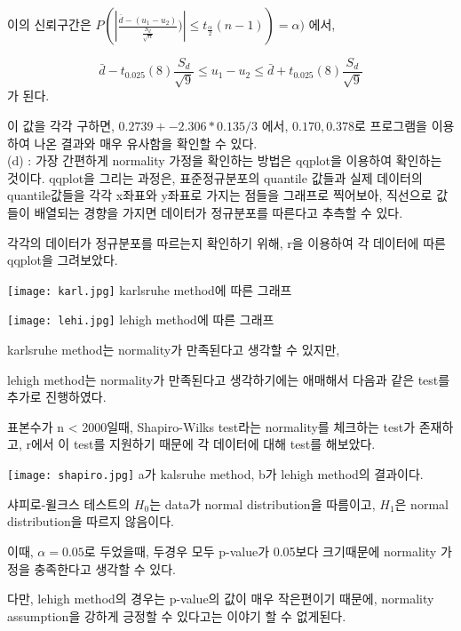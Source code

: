 \documentclass{article}
\begin{document}
이의 신뢰구간은 $P(|\frac{\bar{d} - (u_1 - u_2)}{\frac{S_d}{\sqrt{n}}})| \le t_{\frac{\alpha}{2}}(n-1)) = \alpha)$ 에서,

$$\bar{d} - t_{0.025}(8) \frac{S_d}{\sqrt{9}} \le u_1 - u_2 \le \bar{d} + t_{0.025}(8) \frac{S_d}{\sqrt{9}}$$ 가 된다.
 
이 값을 각각 구하면, $0.2739 +- 2.306 * 0.135 / 3$ 에서, $0.170, 0.378$로 프로그램을 이용하여 나온 결과와 매우 유사함을 확인할 수 있다. \\




(d) : 가장 간편하게 normality 가정을 확인하는 방법은 qqplot을 이용하여 확인하는 것이다.
       qqplot을 그리는 과정은, 표준정규분포의 quantile 값들과 실제 데이터의 quantile값들을 각각 x좌표와 y좌표로 가지는 점들을 그래프로 찍어보아, 직선으로 값들이 배열되는 경향을 가지면 데이터가 정규분포를 따른다고 추측할 수 있다.

각각의 데이터가 정규분포를 따르는지 확인하기 위해, r을 이용하여 각 데이터에 따른 qqplot을 그려보았다.

\begin{center}
    \texttt{[image: karl.jpg]}
karlsruhe method에 따른 그래프
\end{center} 

\begin{center}
    \texttt{[image: lehi.jpg]}
lehigh method에 따른 그래프
\end{center} 


karlsruhe method는 normality가 만족된다고 생각할 수 있지만,

lehigh method는 normality가 만족된다고 생각하기에는 애매해서 다음과 같은 test를 추가로 진행하였다.

표본수가 n < 2000일때, Shapiro-Wilks test라는 normality를 체크하는 test가 존재하고, r에서 이 test를 지원하기 때문에 각 데이터에 대해 test를 해보았다.

\begin{center}
    \texttt{[image: shapiro.jpg]}
a가 kalsruhe method, b가 lehigh method의 결과이다.
\end{center} 


샤피로-윌크스 테스트의 $H_0$는 data가 normal distribution을 따름이고, $H_1$은 normal distribution을 따르지 않음이다.

이때, $\alpha = 0.05$로 두었을때, 두경우 모두 p-value가 0.05보다 크기때문에 normality 가정을 충족한다고 생각할 수 있다.

다만, lehigh method의 경우는 p-value의 값이 매우 작은편이기 때문에, normality assumption을 강하게 긍정할 수 있다고는 이야기 할 수 없게된다. \\
\end{document}
